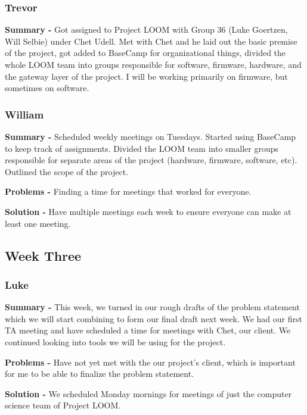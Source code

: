 \documentclass[onecolumn, draftclsnofoot,10pt, compsoc]{IEEEtran}
\begin{document}
\subsubsection*{Trevor}
    \begin{adjustwidth}{2.5em}{0pt}
    \textbf{Summary -} Got assigned to Project LOOM with Group 36 (Luke Goertzen, Will Selbie) under Chet Udell. Met with Chet and he laid out the basic premise of the project, got added to BaseCamp for organizational things, divided the whole LOOM team into groups responsible for software, firmware, hardware, and the gateway layer of the project. I will be working primarily on firmware, but sometimes on software.
    \end{adjustwidth}
\subsubsection*{William}
    \begin{adjustwidth}{2.5em}{0pt}
    \textbf{Summary -} Scheduled weekly meetings on Tuesdays. Started using BaseCamp to keep track of assignments. Divided the LOOM team into smaller groups responsible for separate areas of the project (hardware, firmware, software, etc). Outlined the scope of the project.
    
    \textbf{Problems -} Finding a time for meetings that worked for everyone.
    \end{adjustwidth}
    \begin{adjustwidth}{5em}{0pt}
    \textbf{Solution -} Have multiple meetings each week to ensure everyone can make at least one meeting. 
    \end{adjustwidth}



\subsection{Week Three}
\subsubsection*{Luke}
    \begin{adjustwidth}{2.5em}{0pt}
    \textbf{Summary -} This week, we turned in our rough drafts of the problem statement which we will start combining to form our final draft next week. We had our first TA meeting and have scheduled a time for meetings with Chet, our client. We continued looking into tools we will be using for the project.
    
    \textbf{Problems -} Have not yet met with the our project's client, which is important for me to be able to finalize the problem statement.
    \end{adjustwidth}
    \begin{adjustwidth}{5em}{0pt}
    \textbf{Solution -} We scheduled Monday mornings for meetings of just the computer science team of Project LOOM.
    \end{adjustwidth}
\end{document}
